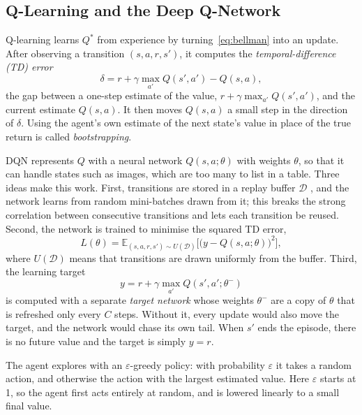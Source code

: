 \documentclass[conference,a4paper]{IEEEtran}
\begin{document}
\subsection{Q-Learning and the Deep Q-Network}
Q-learning \citep{watkins1992q} learns $Q^*$ from experience by turning~\eqref{eq:bellman} into an update. After
observing a transition $(s,a,r,s')$, it computes the \emph{temporal-difference (TD) error}
\begin{equation}
\delta=r+\gamma\max_{a'}Q(s',a')-Q(s,a),
\end{equation}
the gap between a one-step estimate of the value, $r+\gamma\max_{a'}Q(s',a')$, and the current estimate $Q(s,a)$. It then
moves $Q(s,a)$ a small step in the direction of $\delta$. Using the agent's own estimate of the next state's value
in place of the true return is called \emph{bootstrapping}.

DQN \citep{mnih2015human} represents $Q$ with a neural network $Q(s,a;\theta)$ with weights $\theta$, so that it can
handle states such as images, which are too many to list in a table. Three ideas make this work. First, transitions
are stored in a replay buffer $\mathcal{D}$ \citep{lin1992self}, and the network learns from random mini-batches drawn
from it; this breaks the strong correlation between consecutive transitions and lets each transition be reused.
Second, the network is trained to minimise the squared TD error,
\begin{equation}
L(\theta)=\mathbb{E}_{(s,a,r,s')\sim U(\mathcal{D})}\Big[\big(y-Q(s,a;\theta)\big)^2\Big],
\label{eq:loss}
\end{equation}
where $U(\mathcal{D})$ means that transitions are drawn uniformly from the buffer. Third, the learning target
\begin{equation}
y=r+\gamma\max_{a'}Q(s',a';\theta^-)
\label{eq:dqn}
\end{equation}
is computed with a separate \emph{target network} whose weights $\theta^-$ are a copy of $\theta$ that is refreshed only
every $C$ steps. Without it, every update would also move the target, and the network would chase its own tail. When
$s'$ ends the episode, there is no future value and the target is simply $y=r$.

The agent explores with an $\varepsilon$-greedy policy: with probability $\varepsilon$ it takes a random action, and
otherwise the action with the largest estimated value. Here $\varepsilon$ starts at 1, so the agent first acts
entirely at random, and is lowered linearly to a small final value.
\end{document}

